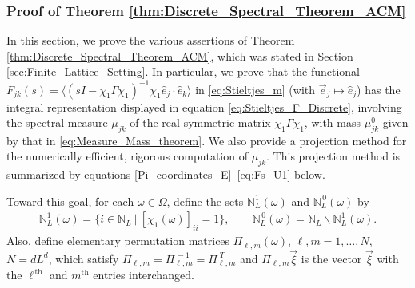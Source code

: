 \documentclass{cmslatex}
\begin{document}
\subsubsection{Proof of Theorem
  \ref{thm:Discrete_Spectral_Theorem_ACM}}
\label{sec:Theorem_Proof}
%
In this section, we prove the various assertions of Theorem
\ref{thm:Discrete_Spectral_Theorem_ACM}, which was stated in Section
\ref{sec:Finite_Lattice_Setting}. In particular, we prove that the functional
$F_{jk}(s)=\langle(sI-\chi_1\Gamma\chi_1)^{-1}\chi_1\hat{e}_j\cdot\hat{e}_k\rangle$ in
\eqref{eq:Stieltjes_m} (with
$\vec{e}_j\mapsto\hat{e}_j$) has the integral representation displayed in
equation \eqref{eq:Stieltjes_F_Discrete}, involving the spectral
measure $\mu_{jk}$ of the real-symmetric matrix $\chi_1\Gamma\chi_1$, with mass
$\mu^0_{jk}$ given by that in \eqref{eq:Measure_Mass_theorem}. We also provide a
projection method for the numerically efficient, rigorous computation of
$\mu_{jk}$. This projection method is summarized by equations
\eqref{Pi_coordinates_E}--\eqref{eq:Fs_U1} below.   





Toward this goal,
for each $\omega\in\Omega$, define the sets $\mathbb{N}_L^1(\omega)$ and
$\mathbb{N}_L^{\,0}(\omega)$ by
% 
\begin{align}\label{eq:Zero_One_indices}
  \mathbb{N}_L^1(\omega)=\{i\in\mathbb{N}_L \ | \ [\chi_1(\omega)]_{ii}=1\}, \qquad
  \mathbb{N}_L^{\,0}(\omega)=\mathbb{N}_L\backslash \mathbb{N}_L^1(\omega).
\end{align}
%
Also, define elementary permutation matrices \cite{Demmel:1997}
$\Pi_{\ell,m}(\omega)$, $\ell,m=1,\ldots,N$, $N=dL^d$, which satisfy
$\Pi_{\ell,m}=\Pi_{\ell,m}^{\,-1}=\Pi_{\ell,m}^{\;T}$ and $\Pi_{\ell,m}\vec{\xi}$ is the
vector $\vec{\xi}$ with the $\ell^{\,\text{th}}$ and $m^{\text{th}}$
entries interchanged. 
\end{document}
